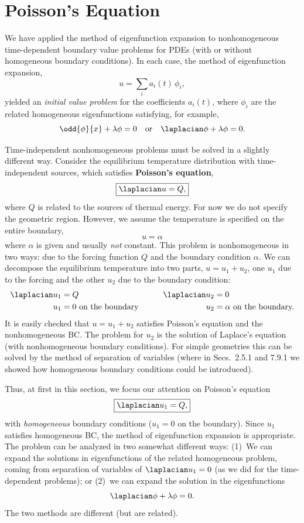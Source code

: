 \section{Poisson's Equation}
\label{sec:poisson}

We have applied the method of eigenfunction expansion to nonhomogeneous time-dependent boundary value problems for PDEs (with or without homogeneous boundary conditions).  In each case, the method of eigenfunction expansion,
\[
u = \sum_i a_i(t)\,\phi_i,
\]
yielded an \emph{initial value problem} for the coefficients $a_i(t)$, where $\phi_i$ are the related homogeneous eigenfunctions satisfying, for example,
\[
\odd{\phi}{x} + \lambda\phi = 0 \quad\text{or}\quad \laplacian\phi + \lambda\phi = 0.
\]

Time-independent nonhomogeneous problems must be solved in a slightly different way.  Consider the equilibrium temperature distribution with time-independent sources, which satisfies \textbf{Poisson's equation},
\begin{equation}
\label{eq:8.6.1}
\boxed{\laplacian u = Q,}
\end{equation}
where $Q$ is related to the sources of thermal energy.  For now we do not specify the geometric region.  However, we assume the temperature is specified on the entire boundary,
\[
u = \alpha
\]
where $\alpha$ is given and usually \emph{not} constant.  This problem is nonhomogeneous in two ways: due to the forcing function $Q$ and the boundary condition $\alpha$.  We can decompose the equilibrium temperature into two parts, $u = u_1 + u_2$, one $u_1$ due to the forcing and the other $u_2$ due to the boundary condition:
\begin{alignat*}{2}
\laplacian u_1 &= Q &\qquad \laplacian u_2 &= 0 \\
u_1 &= 0 \text{ on the boundary} &\qquad u_2 &= \alpha \text{ on the boundary.}
\end{alignat*}
It is easily checked that $u = u_1 + u_2$ satisfies Poisson's equation and the nonhomogeneous BC.  The problem for $u_2$ is the solution of Laplace's equation (with nonhomogeneous boundary conditions).  For simple geometries this can be solved by the method of separation of variables (where in Secs.~2.5.1 and 7.9.1 we showed how homogeneous boundary conditions could be introduced).

Thus, at first in this section, we focus our attention on Poisson's equation
\begin{equation}
\label{eq:8.6.2}
\boxed{\laplacian u_1 = Q,}
\end{equation}
with \emph{homogeneous} boundary conditions ($u_1 = 0$ on the boundary).  Since $u_1$ satisfies homogeneous BC, the method of eigenfunction expansion is appropriate.  The problem can be analyzed in two somewhat different ways: (1)~We can expand the solutions in eigenfunctions of the related homogeneous problem, coming from separation of variables of $\laplacian u_1 = 0$ (as we did for the time-dependent problems); or (2)~we can expand the solution in the eigenfunctions
\[
\laplacian\phi + \lambda\phi = 0.
\]
The two methods are different (but are related).

